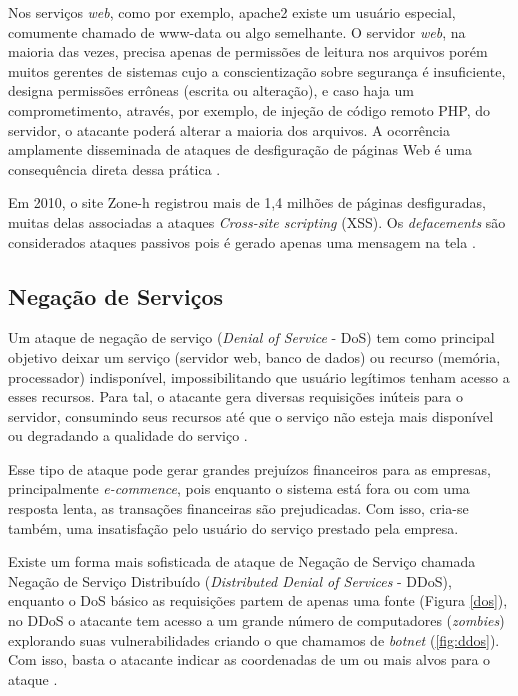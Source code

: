  Nos serviços \textit{web}, como por exemplo, apache2 existe um usuário especial, comumente chamado de www-data ou algo semelhante. O servidor \textit{web}, na maioria das vezes, precisa apenas de permissões de leitura nos arquivos porém muitos gerentes de sistemas cujo a conscientização sobre segurança é insuficiente, designa permissões errôneas (escrita ou alteração), e caso haja um comprometimento, através, por exemplo, de injeção de código remoto PHP, do servidor, o atacante poderá alterar a maioria dos arquivos. A ocorrência amplamente disseminada de ataques de desfiguração de páginas Web é uma consequência direta dessa prática \cite{seguranca:william-lawrie}.

 Em 2010, o site Zone-h registrou mais de 1,4 milhões de páginas desfiguradas, muitas delas associadas a ataques \textit{Cross-site scripting} (XSS). Os \textit{defacements} são considerados ataques passivos pois é gerado apenas uma mensagem na tela \cite{angelo-xss}.

 \subsection{Negação de Serviços} \label{sec:negação}
 
Um ataque de negação de serviço (\textit{Denial of Service} - DoS) tem como principal objetivo deixar um serviço (servidor web, banco de dados) ou recurso (memória, processador)  indisponível, impossibilitando que usuário legítimos tenham acesso a esses recursos. Para tal, o atacante gera diversas requisições inúteis para o servidor, consumindo seus recursos até que o serviço não esteja mais disponível ou degradando a qualidade do serviço \cite{cryptsec}.

Esse tipo de ataque pode gerar grandes prejuízos financeiros para as empresas, principalmente \textit{e-commence}, pois enquanto o sistema está fora ou com uma resposta lenta, as transações financeiras são prejudicadas. Com isso, cria-se também, uma insatisfação pelo usuário do serviço prestado pela empresa.

Existe um forma mais sofisticada de ataque de Negação de Serviço chamada Negação de Serviço Distribuído (\textit{Distributed Denial of Services} - DDoS), enquanto o DoS básico as requisições partem de apenas uma fonte (Figura \ref{dos}), no DDoS o atacante tem acesso a um grande número de computadores (\textit{zombies}) explorando suas vulnerabilidades criando o que chamamos de \textit{botnet} (\autoref{fig:ddos}). Com isso, basta o atacante indicar as coordenadas de um ou mais alvos para o ataque \cite{zargarjoshitipper}. 

